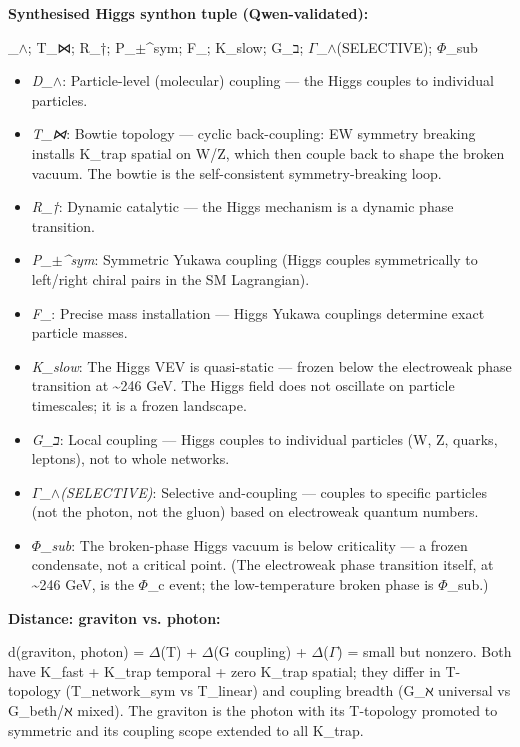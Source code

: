 \documentclass[12pt,a4paper]{article}
\begin{document}
\textbf{Synthesised Higgs synthon tuple (Qwen-validated):}

\langleD\_$\land$; T\_⋈; R\_†; P\_$\pm$\^{}sym; F\_\hbar; K\_slow; G\_ב; $\Gamma$\_$\land$(SELECTIVE); $\Phi$\_sub\rangle

\begin{itemize}
    \item \emph{D\_$\land$}: Particle-level (molecular) coupling --- the Higgs couples to individual particles.
    \item \emph{T\_⋈}: Bowtie topology --- cyclic back-coupling: EW symmetry breaking installs K\_trap spatial on W/Z, which then couple back to shape the broken vacuum. The bowtie is the self-consistent symmetry-breaking loop.
    \item \emph{R\_†}: Dynamic catalytic --- the Higgs mechanism is a dynamic phase transition.
    \item \emph{P\_$\pm$\^{}sym}: Symmetric Yukawa coupling (Higgs couples symmetrically to left/right chiral pairs in the SM Lagrangian).
    \item \emph{F\_\hbar}: Precise mass installation --- Higgs Yukawa couplings determine exact particle masses.
    \item \emph{K\_slow}: The Higgs VEV is quasi-static --- frozen below the electroweak phase transition at \textasciitilde{}246 GeV. The Higgs field does not oscillate on particle timescales; it is a frozen landscape.
    \item \emph{G\_ב}: Local coupling --- Higgs couples to individual particles (W, Z, quarks, leptons), not to whole networks.
    \item \emph{$\Gamma$\_$\land$(SELECTIVE)}: Selective and-coupling --- couples to specific particles (not the photon, not the gluon) based on electroweak quantum numbers.
    \item \emph{$\Phi$\_sub}: The broken-phase Higgs vacuum is below criticality --- a frozen condensate, not a critical point. (The electroweak phase transition itself, at \textasciitilde{}246 GeV, is the $\Phi$\_c event; the low-temperature broken phase is $\Phi$\_sub.)
\end{itemize}

\textbf{Distance: graviton vs. photon:}

d(graviton, photon) = $\Delta$(T) + $\Delta$(G coupling) + $\Delta$($\Gamma$) = small but nonzero. Both have K\_fast + K\_trap temporal + zero K\_trap spatial; they differ in T-topology (T\_network\_sym vs T\_linear) and coupling breadth (G\_ℵ universal vs G\_beth/ℵ mixed). The graviton is the photon with its T-topology promoted to symmetric and its coupling scope extended to all K\_trap.
\end{document}
